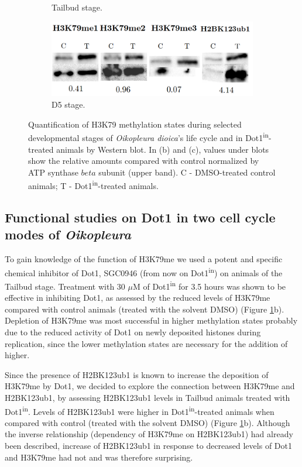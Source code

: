 \documentclass[11pt,twoside,a4paper]{report}
\begin{document}
\begin{figure}[h!]
\begin{subfigure}{.5\textwidth}
			\caption{Tailbud stage.}
		\end{subfigure}
		\begin{subfigure}{.7\textwidth}
			\centering
			\includegraphics[width=1\linewidth]{pngs/D5_Dot1_in.png}
			\caption{D5 stage.}
		\end{subfigure}
		\caption[H3K79 methylation states during selected developmental stages of \textit{Oikopleura} and in Dot1\textsuperscript{in}-treated animals]
		{Quantification of H3K79 methylation states during selected developmental stages of \textit{Oikopleura dioica}'s life cycle and in Dot1\textsuperscript{in}-treated animals by Western blot.
			{\footnotesize
				In (b) and (c), values under blots show the relative amounts compared with control normalized by ATP synthase $beta$ subunit (upper band). C - DMSO-treated control animals; T - Dot1\textsuperscript{in}-treated animals.
			}
		}
		\label{fig:k79me}
	\end{figure}
	
	\subsection{Functional studies on Dot1 in two cell cycle modes of \textit{Oikopleura}}
	
	To gain knowledge of the function of H3K79me we used a potent and specific chemical inhibitor of Dot1, SGC0946 (from now on Dot1\textsuperscript{in}) \cite{Yu2012} on animals of the Tailbud stage. Treatment with 30 $\mu$M of Dot1\textsuperscript{in} for 3.5 hours was shown to be effective in inhibiting Dot1, as assessed by the reduced levels of H3K79me compared with control animals (treated with the solvent DMSO) (Figure \ref{fig:k79me}b). Depletion of H3K79me was most successful in higher methylation states probably due to the reduced activity of Dot1 on newly deposited histones during replication, since the lower methylation states are necessary for the addition of higher.
	
	Since the presence of H2BK123ub1 is known to increase the deposition of H3K79me by Dot1, we decided to explore the connection between H3K79me and H2BK123ub1, by assessing H2BK123ub1 levels in Tailbud animals treated with Dot1\textsuperscript{in}. Levels of H2BK123ub1 were higher in Dot1\textsuperscript{in}-treated animals when compared with control (treated with the solvent DMSO) (Figure \ref{fig:k79me}b). Although the inverse relationship (dependency of H3K79me on H2BK123ub1) had already been described, increase of H2BK123ub1 in response to decreased levels of Dot1 and H3K79me had not and was therefore surprising. 
	
\end{document}
